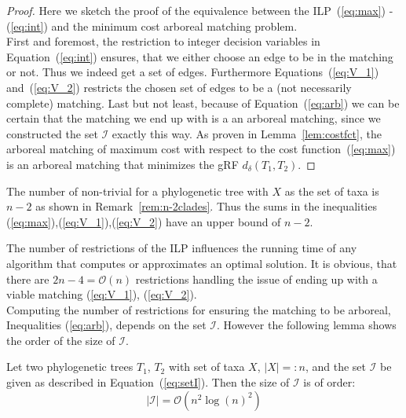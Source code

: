 \begin{proof}Here we sketch the proof of the equivalence between the ILP~(\ref{eq:max}) - (\ref{eq:int}) and the minimum cost arboreal matching problem.\\
First and foremost, the restriction to integer decision variables in Equation~(\ref{eq:int}) ensures, that we either choose an edge to be in the matching or not. Thus we indeed get a set of edges. Furthermore Equations~(\ref{eq:V_1}) and~(\ref{eq:V_2}) restricts the chosen set of edges to be a (not necessarily complete) matching. Last but not least, because of Equation~(\ref{eq:arb}) we can be certain that the matching we end up with is a an arboreal matching, since we constructed the set $\mathcal{I}$ exactly this way. As proven in Lemma~\ref{lem:costfct}, the arboreal matching of maximum cost with respect to the cost function~(\ref{eq:max}) is an arboreal matching that minimizes the gRF $d_{\delta}(T_1, T_2)$.
\end{proof}
\begin{rem}
The number of non-trivial for a phylogenetic tree with $X$ as the set of taxa is $n-2$ as shown in Remark~\ref{rem:n-2clades}. Thus the sums in the inequalities (\ref{eq:max}),(\ref{eq:V_1}),(\ref{eq:V_2}) have an upper bound of $n-2$.\\
\end{rem}
The number of restrictions of the ILP influences the running time of any algorithm that computes or approximates an optimal solution. It is obvious, that there are $2n-4=\mathcal{O}(n)$ restrictions handling the issue of ending up with a viable matching (\ref{eq:V_1}), (\ref{eq:V_2}). \\
Computing the number of restrictions for ensuring the matching to be arboreal, Inequalities (\ref{eq:arb}), depends on the set $\mathcal{I}$. However the following lemma shows the order of the size of $\mathcal{I}$.
\begin{lem}\label{lem:numberOfRestrictions}
Let two phylogenetic trees $T_1$, $T_2$ with set of taxa $X$, $|X| =: n$, and the set $\mathcal{I}$ be given as described in Equation~(\ref{eq:setI}). Then the size of $\mathcal{I}$ is of order:
$$|\mathcal{I}| = \mathcal{O}(n^2 \log(n)^2)$$
\end{lem}
